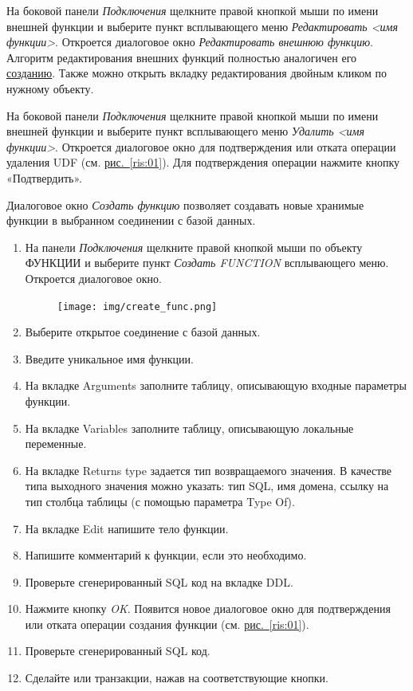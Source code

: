 На боковой панели \textit{Подключения} щелкните правой кнопкой мыши по имени внешней функции и выберите пункт всплывающего меню \textit{Редактировать <имя функции>}. Откроется диалоговое окно \textit{Редактировать внешнюю функцию}. Алгоритм редактирования внешних функций полностью аналогичен его \hyperref[sec:crexfunc]{созданию}.
Также можно открыть вкладку редактирования двойным кликом по нужному объекту. 

На боковой панели \textit{Подключения} щелкните правой кнопкой мыши по имени внешней функции и выберите пункт всплывающего меню \textit{Удалить <имя функции>}. Откроется  диалоговое окно для подтверждения или отката операции удаления UDF (см. \hyperref[ris:01]{рис.~\ref{ris:01}}). Для подтверждения операции нажмите кнопку «Подтвердить».


\label{sec:crfunc}

Диалоговое окно \textit{Создать функцию} позволяет создавать новые хранимые функции в выбранном соединении с базой данных.

\begin{enumerate}[leftmargin=26pt]
	\item На панели \textit{Подключения} щелкните правой кнопкой мыши по объекту ФУНКЦИИ и выберите пункт \textit{Создать FUNCTION} всплывающего меню. Откроется диалоговое окно.
	\begin{figure}[H]
		\centering
		\texttt{[image: img/create\_func.png]}
	\end{figure}
	\item Выберите открытое соединение с базой данных.
	\item Введите уникальное имя функции.
	\item На вкладке Arguments заполните таблицу, описывающую входные параметры функции.
	\item На вкладке Variables заполните таблицу, описывающую локальные переменные.
	\item На вкладке Returns type задается тип возвращаемого значения. В качестве типа выходного значения можно указать: тип SQL, имя домена, ссылку на тип столбца таблицы (с помощью параметра Type Of).
	\item На вкладке Edit напишите тело функции.
	\item Напишите комментарий к функции, если это необходимо.
	\item Проверьте сгенерированный SQL код на вкладке DDL.
	\item Нажмите кнопку \textit{OK}. Появится новое диалоговое окно для подтверждения или отката операции создания функции (см. \hyperref[ris:01]{рис.~\ref{ris:01}}).
	\item Проверьте сгенерированный SQL код.
	\item Сделайте  или  транзакции, нажав на соответствующие кнопки.
\end{enumerate}


